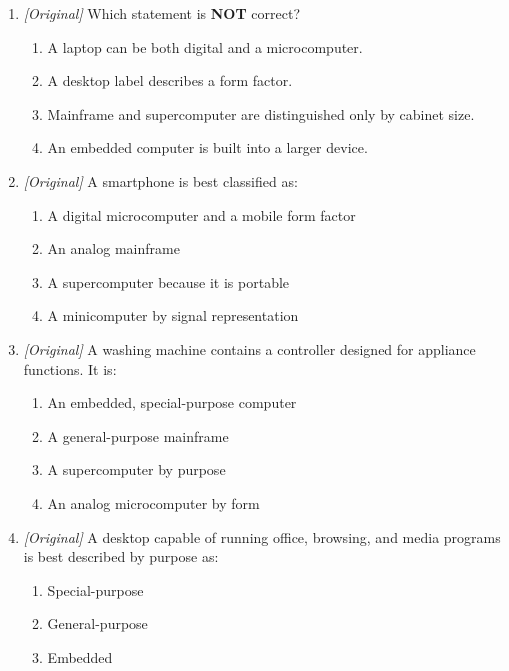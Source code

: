\begin{enumerate}[label=\textbf{Q\arabic*.}, leftmargin=*]
  \begin{enumerate}[label=\Alph*.]
    \item Microcomputer
    \item Mainframe
    \item Supercomputer
    \item Minicomputer
  \end{enumerate}
\item \textit{[Original]} Which statement is \textbf{NOT} correct?
  \begin{enumerate}[label=\Alph*.]
    \item A laptop can be both digital and a microcomputer.
    \item A desktop label describes a form factor.
    \item Mainframe and supercomputer are distinguished only by cabinet size.
    \item An embedded computer is built into a larger device.
  \end{enumerate}
\item \textit{[Original]} A smartphone is best classified as:
  \begin{enumerate}[label=\Alph*.]
    \item A digital microcomputer and a mobile form factor
    \item An analog mainframe
    \item A supercomputer because it is portable
    \item A minicomputer by signal representation
  \end{enumerate}
\item \textit{[Original]} A washing machine contains a controller designed
  for appliance functions. It is:
  \begin{enumerate}[label=\Alph*.]
    \item An embedded, special-purpose computer
    \item A general-purpose mainframe
    \item A supercomputer by purpose
    \item An analog microcomputer by form
  \end{enumerate}
\item \textit{[Original]} A desktop capable of running office, browsing, and
  media programs is best described by purpose as:
  \begin{enumerate}[label=\Alph*.]
    \item Special-purpose
    \item General-purpose
    \item Embedded

\end{enumerate}
\end{enumerate}
